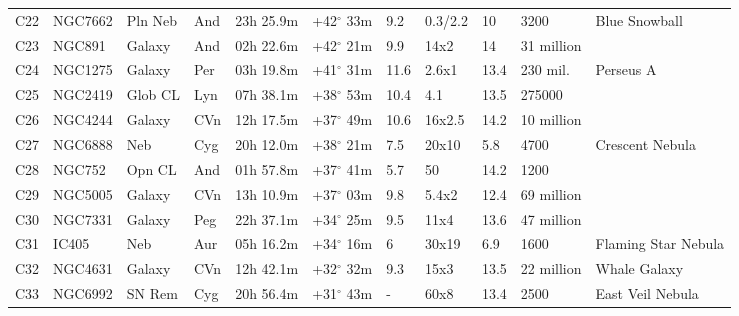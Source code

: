 \documentclass[10pt,twoside,a4paper,english]{article}
\begin{document}
\begin{longtable}{@{}lllllllllll@{}}
C22        & NGC7662     & Pln Neb    & And       & 23h 25.9m & +42$^{\circ}$ 33m  & 9.2       & 0.3/2.2              & 10       & 3200                & Blue Snowball                   \\ 
C23        & NGC891      & Galaxy     & And       & 02h 22.6m & +42$^{\circ}$ 21m  & 9.9       & 14x2                 & 14       & 31 million          &                                 \\ 
C24        & NGC1275     & Galaxy     & Per       & 03h 19.8m & +41$^{\circ}$ 31m  & 11.6      & 2.6x1                & 13.4     & 230 mil.            & Perseus A                       \\ 
C25        & NGC2419     & Glob CL    & Lyn       & 07h 38.1m & +38$^{\circ}$ 53m  & 10.4      & 4.1                  & 13.5     & 275000              &                                 \\ 
C26        & NGC4244     & Galaxy     & CVn       & 12h 17.5m & +37$^{\circ}$ 49m  & 10.6      & 16x2.5               & 14.2     & 10 million          &                                 \\ 
C27        & NGC6888     & Neb        & Cyg       & 20h 12.0m & +38$^{\circ}$ 21m  & 7.5       & 20x10                & 5.8      & 4700                & Crescent Nebula                 \\ 
C28        & NGC752      & Opn CL     & And       & 01h 57.8m & +37$^{\circ}$ 41m  & 5.7       & 50                   & 14.2     & 1200                &                                 \\ 
C29        & NGC5005     & Galaxy     & CVn       & 13h 10.9m & +37$^{\circ}$ 03m  & 9.8       & 5.4x2                & 12.4     & 69 million          &                                 \\ 
C30        & NGC7331     & Galaxy     & Peg       & 22h 37.1m & +34$^{\circ}$ 25m  & 9.5       & 11x4                 & 13.6     & 47 million          &                                 \\ 
C31        & IC405       & Neb        & Aur       & 05h 16.2m & +34$^{\circ}$ 16m  & 6         & 30x19                & 6.9      & 1600                & Flaming Star Nebula             \\ 
C32        & NGC4631     & Galaxy     & CVn       & 12h 42.1m & +32$^{\circ}$ 32m  & 9.3       & 15x3                 & 13.5     & 22 million          & Whale Galaxy                    \\ 
C33        & NGC6992    & SN Rem     & Cyg       & 20h 56.4m & +31$^{\circ}$ 43m  & -         & 60x8                 & 13.4     & 2500                & East Veil Nebula                \\ 

\end{longtable}
\end{document}
